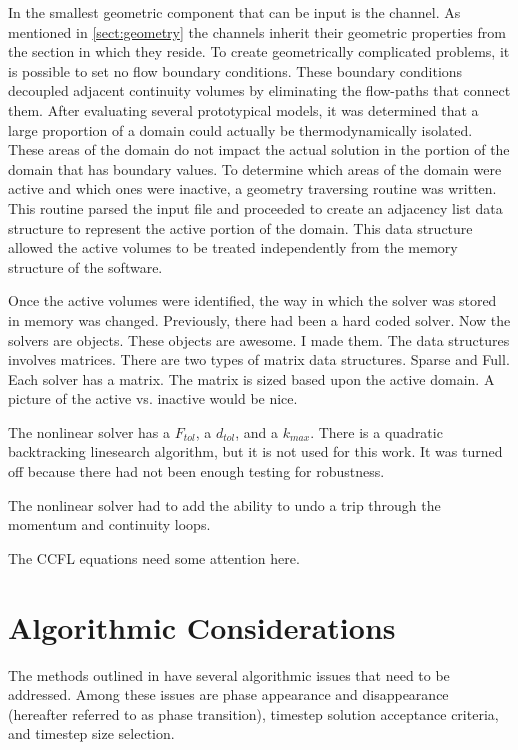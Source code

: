 In \cobra{} the smallest geometric component that can be input is the channel.
As mentioned in \ref{sect:geometry} the channels inherit their geometric properties from the section in which they reside.
To create geometrically complicated problems, it is possible to set no flow boundary conditions.
These boundary conditions decoupled adjacent continuity volumes by eliminating the flow-paths that connect them.
After evaluating several prototypical models, it was determined that a large proportion of a domain could actually be thermodynamically isolated.
These areas of the domain do not impact the actual solution in the portion of the domain that has boundary values.
To determine which areas of the domain were active and which ones were inactive, a geometry traversing routine was written.
This routine parsed the input file and proceeded to create an adjacency list data structure to represent the active portion of the domain.
This data structure allowed the active volumes to be treated independently from the memory structure of the software.

Once the active volumes were identified, the way in which the solver was stored in memory was changed.
Previously, there had been a hard coded solver.
Now the solvers are objects.
These objects are awesome.
I made them.
The data structures involves matrices.
There are two types of matrix data structures.
Sparse and Full.
Each solver has a matrix.
The matrix is sized based upon the active domain.
A picture of the active vs. inactive would be nice.

The nonlinear solver has a $F_{tol}$, a $d_{tol}$, and a $k_{max}$.
There is a quadratic backtracking linesearch algorithm, but it is not used for this work.
It was turned off because there had not been enough testing for robustness.

The nonlinear solver had to add the ability to undo a trip through the momentum and continuity loops.

The CCFL equations need some attention here.
\section{Algorithmic Considerations}
\label{sect:nln_algo_con}

The methods outlined in  have several algorithmic issues that need to be addressed.
Among these issues are phase appearance and disappearance (hereafter referred to as phase transition), timestep solution acceptance criteria, and timestep size selection.

